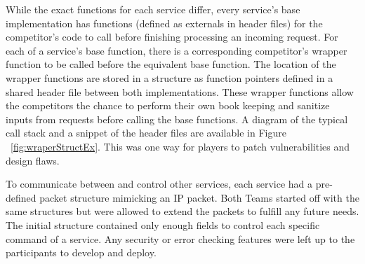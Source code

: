 \documentclass[10pt]{article}
\begin{document}
While the exact functions for each service differ, every service's base
implementation has functions (defined as externals in header files)
for the competitor's code to call before finishing processing an incoming
request. For each of a service's base function, there is a corresponding
competitor's wrapper function to be called before the equivalent base function.
The location of the wrapper functions are stored in a structure as function
pointers defined in a shared header file between both implementations. These
wrapper functions allow the competitors the chance to perform their own book
keeping and sanitize inputs from requests before calling the base functions. A
diagram of the typical call stack and a snippet of the header files are
available in Figure ~\ref{fig:wraperStructEx}. This was one way for players to
patch vulnerabilities and design flaws.

To communicate between and control other services, each service had a
pre-defined packet structure mimicking an IP packet. Both Teams started off with
the same structures but were allowed to extend the packets to fulfill any
future needs. The initial structure contained only enough fields to control each
specific command of a service. Any security or error checking features were left
up to the participants to develop and deploy. 
\end{document}
